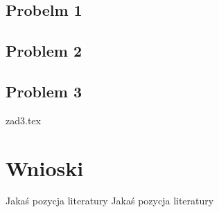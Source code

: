 \documentclass[twoside]{pracaInzynierskaMS}
\begin{document}
\subsection     {Probelm 1}


\newpage
\subsection     {Problem 2}


\newpage
\subsection     {Problem 3}
 {zad3.tex}

\section        {Wnioski}

   
\begin{thebibliography}{12}

 Jakaś pozycja literatury
 Jakaś pozycja literatury

\end{thebibliography}
\end{document}
